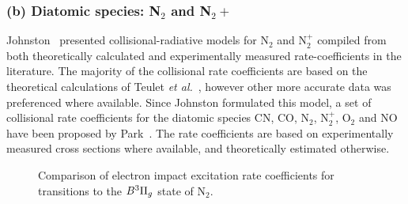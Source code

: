 {\subsubsection{(b) Diatomic species: N$_2$ and N$_2+$}

Johnston~\cite{JohnPhd} presented collisional-radiative models for N$_2$ and N$_2^+$ compiled from both theoretically calculated and experimentally measured rate-coefficients in the literature.
The majority of the collisional rate coefficients are based on the theoretical calculations of Teulet \textit{et al.}~\cite{TSG1999}, however other more accurate data was preferenced where available.
Since Johnston formulated this model, a set of collisional rate coefficients for the diatomic species CN, CO, N$_2$, N$_2^+$, O$_2$ and NO have been proposed by Park~\cite{park2008a, park2008b}.
The rate coefficients are based on experimentally measured cross sections where available, and theoretically estimated otherwise.

\par

\begin{figure}[t]
 \centering
 \caption{Comparison of electron impact excitation rate coefficients for transitions to the $B^3 \Pi_g$ state of N$_2$.}
 \label{fig:K_EIE_N2}
\end{figure}

}

